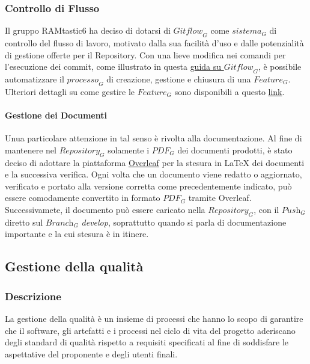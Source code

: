 \subsubsection{Controllo di Flusso}
Il gruppo RAMtastic6 ha deciso di dotarsi di $\textit{Gitflow}_G$ come $\textit{sistema}_G$ di controllo del flusso di lavoro, motivato dalla sua facilità d'uso e dalle potenzialità di gestione offerte per il Repository. Con una lieve modifica nei comandi per l'esecuzione dei commit, come illustrato in questa \href{https://www.atlassian.com/git/tutorials/comparing-workflows/gitflow-workflow}{guida su $\textit{Gitflow}_G$}, è possibile automatizzare il $\textit{processo}_G$ di creazione, gestione e chiusura di una $\textit{Feature}_G$. Ulteriori dettagli su come gestire le $\textit{Feature}_G$ sono disponibili a questo \href{http://danielkummer.github.io/git-flow-cheatsheet/}{link}.
\paragraph{Gestione dei Documenti}
Unua particolare attenzione in tal senso è rivolta alla documentazione. Al fine di mantenere nel $\textit{Repository}_G$ solamente i $\textit{PDF}_G$ dei documenti prodotti, è stato deciso di adottare la piattaforma \href{https://www.overleaf.com/project}{Overleaf} per la stesura in LaTeX dei documenti e la successiva verifica. Ogni volta che un documento viene redatto o aggiornato, verificato e portato alla versione corretta come precedentemente indicato, può essere comodamente convertito in formato $\textit{PDF}_G$ tramite Overleaf. Successivamete, il documento può essere caricato nella $\textit{Repository}_G$, con il $\textit{Push}_G$ diretto sul $\textit{Branch}_G$ \textit{develop}, soprattutto quando si parla di documentazione importante e la cui stesura è in itinere.
\subsection{Gestione della qualità}
\subsubsection{Descrizione}
La gestione della qualità è un insieme di processi che hanno lo scopo di garantire che il software, gli artefatti e i processi nel ciclo di vita del progetto aderiscano degli standard di qualità rispetto a requisiti specificati al fine di soddisfare le aspettative del proponente e degli utenti finali.
